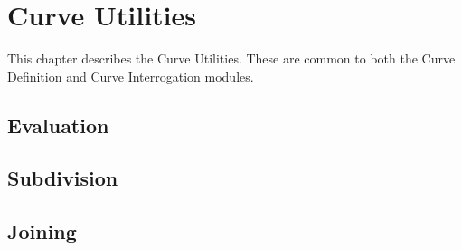 \chapter{Curve Utilities}
\label{curveutilities}
This chapter describes the Curve Utilities.
These are common to both the Curve Definition and Curve Interrogation modules.


\pgsbreak
\section{Evaluation}

\pgsbreak

\pgsbreak

\pgsbreak

\pgsbreak


\section {Subdivision}

\pgsbreak

\pgsbreak

\pgsbreak

\pgsbreak

\pgsbreak

\pgsbreak
\section{Joining}

\pgsbreak

\pgsbreak

\pgsbreak


